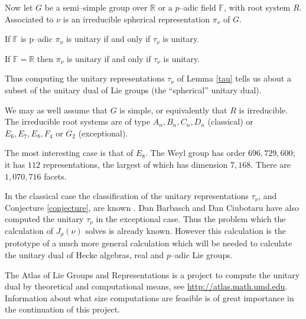 Now let $G$ be a semi--simple group over $\mathbb R$ or a $p$--adic
field $\mathbb F$, with root system
$R$.  Associated to $\nu$ is an irreducible spherical representation
$\pi_\nu$ of $G$.

\begin{lemma}
\label{padic}
If $\mathbb F$ is p--adic $\pi_\nu$ is unitary if and only if $\tau_\nu$ is unitary.
\end{lemma}

\begin{conjecture}
\label{conjecture}
If $\mathbb F=\mathbb R$ then $\pi_\nu$ is unitary if and only if
$\tau_\nu$ is unitary.
\end{conjecture}

Thus computing the unitary representations $\tau_\nu$ of Lemma
\ref{tau} tells us about a subset of the unitary dual of Lie groups
(the ``spherical'' unitary dual).

We may as well assume that $G$ is simple, or equivalently that $R$ is
irreducible. The irreducible root systems are of type
$A_n,B_n,C_n,D_n$ (classical) or $E_6,E_7,E_8, F_4$
or $G_2$ (exceptional).

The most interesting case is that of $E_8$.  The Weyl group has order
$696,729,600$; it has $112$ representations, the largest of which
has dimension $7,168$.  There are $1,070,716$ facets.

In the classical case the classification of the unitary
representations $\tau_\nu$, and Conjecture \ref{conjecture},
are known \cite{barbasch_spherical}.
Dan Barbasch and Dan Ciubotaru have also computed the unitary
$\tau_\nu$ in the exceptional case.
Thus the problem which the calculation of $J_\rho(\nu)$ solves is
already known. However this calculation is the prototype of a much
more general calculation which will be needed to calculate the unitary
dual of Hecke algebras, real and $p$--adic Lie groups.

The Atlas of Lie Groups and Representations 
is a project to compute  the unitary dual by theoretical and computational
means, see \url{http://atlas.math.umd.edu}. 
Information about what size computations are feasible is of
great importance in the continuation of this project.




